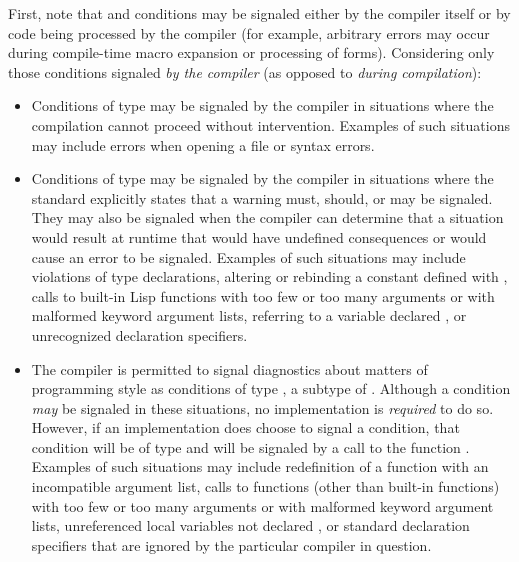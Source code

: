 First, note that
 and  conditions may be signaled either by the compiler itself
or by code being processed by the compiler (for example, arbitrary errors may 
    occur during compile-time macro expansion or processing of 
    forms).
Considering only those conditions signaled \emph{by the compiler} (as
    opposed to \emph{during compilation}):
\begin{itemize}

\item   Conditions of type  may be signaled by the compiler in
        situations where the compilation cannot proceed without
        intervention.  Examples of such situations may include errors when opening
        a file or syntax errors.

\item  Conditions of type  may be signaled by the compiler in 
        situations where the standard explicitly states that a warning must,
        should, or may be signaled.  They may also be signaled
        when the compiler can determine 
        that a situation would result at runtime that would have
        undefined consequences or would cause
        an error to be signaled.
        Examples of such situations may include
            violations of type declarations,
            altering or rebinding a constant defined with ,
            calls to built-in Lisp functions with too few or too many arguments
                or with malformed keyword argument lists,
            referring to a variable declared , or
            unrecognized declaration specifiers.

\item  The compiler is permitted to signal diagnostics about matters of
        programming style as conditions of type , a subtype
    of .  Although 
        a  condition \emph{may} be signaled in these situations, no 
        implementation is \emph{required} to do so.  However, if an 
        implementation does choose to signal a condition, that condition 
        will be of type  and will be signaled by a call to 
        the function .
        Examples of such situations may include
            redefinition of a function with an incompatible argument list,
            calls to functions (other than built-in functions)
                with too few or too many arguments
                or with malformed keyword argument lists,
            unreferenced local variables not declared , or
            standard declaration specifiers that are ignored by 
                the particular compiler in question.
\end{itemize}

